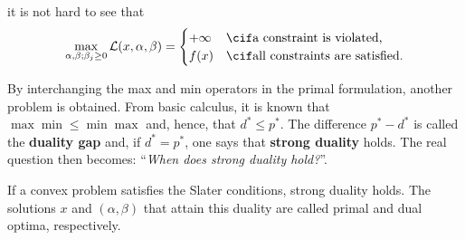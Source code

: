     it is not hard to see that
    \begin{gather}
        \max_{\alpha,\beta;\beta_j\geq0}\mathcal{L}(x,\alpha,\beta) =
        \begin{cases}
            +\infty&\cif\text{a constraint is violated,}\\
            f(x)&\cif\text{all constraints are satisfied}.
        \end{cases}
    \end{gather}

    By interchanging the max and min operators in the primal formulation, another problem is obtained.
    From basic calculus, it is known that $\max\min\leq\min\max$ and, hence, that $d^*\leq p^*$. The difference $p^*-d^*$ is called the \textbf{duality gap} and, if $d^*=p^*$, one says that \textbf{strong duality} holds. The real question then becomes: ``\textit{When does strong duality hold?}''.
    \begin{property}
        If a convex problem satisfies the Slater conditions, strong duality holds. The solutions $x$ and $(\alpha,\beta)$ that attain this duality are called primal and dual optima, respectively.
    \end{property}

